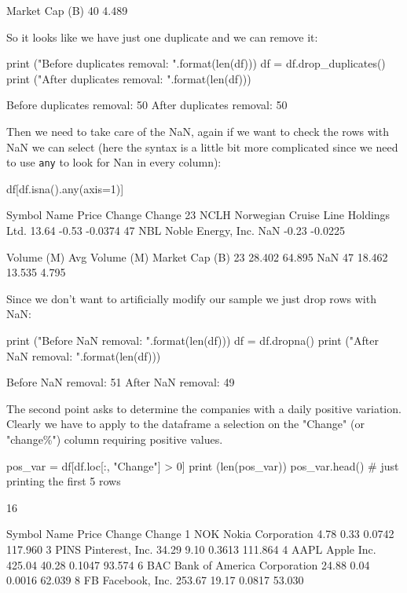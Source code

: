 \begin{solution}
\begin{ipython}
    Market Cap (B)
40           4.489
\end{ipython}
        
So it looks like we have just one duplicate and we can remove it:

\begin{ipython}
print ("Before duplicates removal: {}".format(len(df)))
df = df.drop_duplicates()
print ("After duplicates removal: {}".format(len(df)))

Before duplicates removal: 50
After duplicates removal: 50
\end{ipython}

Then we need to take care of the NaN, again if we want to check the rows with NaN we can select (here the syntax is a little bit more complicated since we need to use \texttt{any} to look for Nan in every column):

\begin{ipython}
df[df.isna().any(axis=1)]

   Symbol                                 Name  Price  Change  Change%
23   NCLH  Norwegian Cruise Line Holdings Ltd.  13.64   -0.53  -0.0374
47    NBL                   Noble Energy, Inc.    NaN   -0.23  -0.0225

    Volume (M)  Avg Volume (M)  Market Cap (B)
23      28.402          64.895             NaN
47      18.462          13.535           4.795
\end{ipython}
        
Since we don't want to artificially modify our sample we just drop rows with NaN:

\begin{ipython}
print ("Before NaN removal: {}".format(len(df)))
df = df.dropna()
print ("After NaN removal: {}".format(len(df)))

Before NaN removal: 51
After NaN removal: 49
\end{ipython}

The second point asks to determine the companies with a daily positive variation. Clearly we have to apply to the dataframe a selection on the "Change" (or "change\%") column requiring positive values.

\begin{ipython}
pos_var = df[df.loc[:, "Change"] > 0]
print (len(pos_var))
pos_var.head() # just printing the first 5 rows

16

  Symbol                         Name   Price  Change  Change%
1    NOK            Nokia Corporation    4.78    0.33   0.0742     117.960
3   PINS              Pinterest, Inc.   34.29    9.10   0.3613     111.864
4   AAPL                   Apple Inc.  425.04   40.28   0.1047      93.574
6    BAC  Bank of America Corporation   24.88    0.04   0.0016      62.039
8     FB               Facebook, Inc.  253.67   19.17   0.0817      53.030


\end{ipython}
\end{solution}
